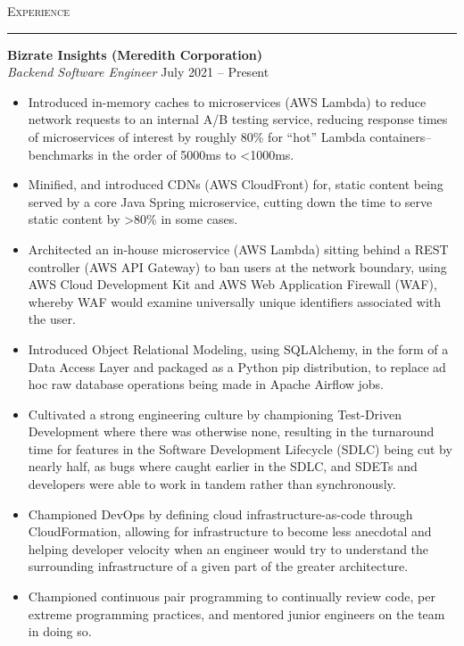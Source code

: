 \documentclass{res}
\begin{document}
\begin{resume}
\textsc{{\Large Experience}}
\vspace{0.5mm}
\hrule width18.5cm
\textbf{Bizrate Insights (Meredith Corporation)}\\
\textit{Backend Software Engineer}
\hfill
July 2021 -- Present\\[1mm]
	\begin{itemize}
		\vspace{-3mm}
    \item Introduced in-memory caches to microservices (AWS Lambda) to reduce network requests to an internal A/B testing service, reducing response times of microservices of interest by roughly 80\% for ``hot'' Lambda containers--benchmarks in the order of 5000ms to \textless 1000ms.
    \item Minified, and introduced CDNs (AWS CloudFront) for, static content being served by a core Java Spring microservice, cutting down the time to serve static content by \textgreater 80\% in some cases.
    \item Architected an in-house microservice (AWS Lambda) sitting behind a REST controller (AWS API Gateway) to ban users at the network boundary, using AWS Cloud Development Kit and AWS Web Application Firewall (WAF), whereby WAF would examine universally unique identifiers associated with the user.
    \item Introduced Object Relational Modeling, using SQLAlchemy, in the form of a Data Access Layer and packaged as a Python pip distribution, to replace ad hoc raw database operations being made in Apache Airflow jobs.
    \item Cultivated a strong engineering culture by championing Test-Driven Development where there was otherwise none, resulting in the turnaround time for features in the Software Development Lifecycle (SDLC) being cut by nearly half, as bugs where caught earlier in the SDLC, and SDETs and developers were able to work in tandem rather than synchronously.
    \item Championed DevOps by defining cloud infrastructure-as-code through CloudFormation, allowing for infrastructure to become less anecdotal and helping developer velocity when an engineer would try to understand the surrounding infrastructure of a given part of the greater architecture.
    \item Championed continuous pair programming to continually review code, per extreme programming practices, and mentored junior engineers on the team in doing so.

\end{itemize}
\end{resume}
\end{document}
